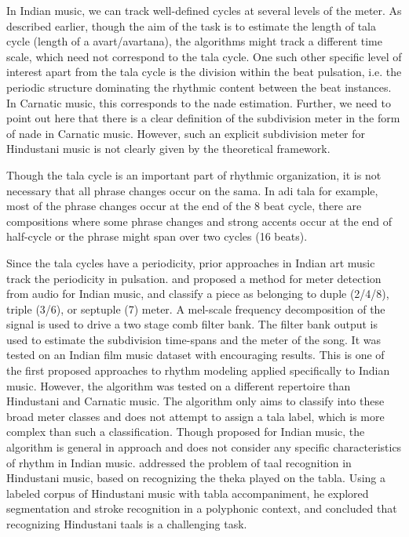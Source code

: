 In Indian music, we can track well-defined cycles at several levels of the meter. As described earlier, though the aim of the task is to estimate the length of \gls{tala} cycle (length of a \gls{avart}/\gls{avartana}), the algorithms might track a different time scale, which need not correspond to the \gls{tala} cycle. One such other specific level of interest apart from the \gls{tala} cycle is the division within the beat pulsation, i.e. the periodic structure dominating the rhythmic content between the beat instances. In Carnatic music, this corresponds to the \gls{nade} estimation. Further, we need to point out here that there is a clear definition of the subdivision meter in the form of \gls{nade} in Carnatic music. However, such an explicit subdivision meter for Hindustani music is not clearly given by the theoretical framework. 

Though the \gls{tala} cycle is an important part of rhythmic organization, it is not necessary that all phrase changes occur on the \gls{sama}. In \gls{adi} \gls{tala} for example, most of the phrase changes occur at the end of the 8 beat cycle, there are compositions where some phrase changes and strong accents occur at the end of half-cycle or the phrase might span over two cycles (16 beats). 

Since the \gls{tala} cycles have a periodicity, prior approaches in Indian art music track the periodicity in pulsation.  and  proposed a method for meter detection from audio for Indian music, and classify a piece as belonging to duple (2/4/8), triple (3/6), or septuple (7) meter. A mel-scale frequency decomposition of the signal is used to drive a two stage comb filter bank. The filter bank output is used to estimate the subdivision time-spans and the meter of the song. It was tested on an Indian film music dataset with encouraging results. This is one of the first proposed approaches to rhythm modeling applied specifically to Indian music. However, the algorithm was tested on a different repertoire than Hindustani and Carnatic music. The algorithm only aims to classify into these broad meter classes and does not attempt to assign a \gls{tala} label, which is more complex than such a classification. Though proposed for Indian music, the algorithm is general in approach and does not consider any specific characteristics of rhythm in Indian music.  addressed the problem of \gls{taal} recognition in Hindustani music, based on recognizing the \gls{theka} played on the \gls{tabla}. Using a labeled corpus of Hindustani music with \gls{tabla} accompaniment, he explored segmentation and stroke recognition in a polyphonic context, and concluded that recognizing Hindustani \glspl{taal} is a challenging task. 

